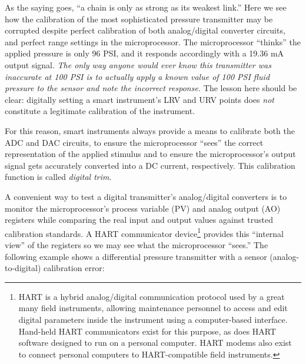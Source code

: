 As the saying goes, ``a chain is only as strong as its weakest link.''  Here we see how the calibration of the most sophisticated pressure transmitter may be corrupted despite perfect calibration of both analog/digital converter circuits, and perfect range settings in the microprocessor.  The microprocessor ``thinks'' the applied pressure is only 96 PSI, and it responds accordingly with a 19.36 mA output signal.  \textit{The only way anyone would ever know this transmitter was inaccurate at 100 PSI is to actually apply a known value of 100 PSI fluid pressure to the sensor and note the incorrect response.}  The lesson here should be clear: digitally setting a smart instrument's LRV and URV points does \textit{not} constitute a legitimate calibration of the instrument.

For this reason, smart instruments always provide a means to calibrate both the ADC and DAC circuits, to ensure the microprocessor ``sees'' the correct representation of the applied stimulus and to ensure the microprocessor's output signal gets accurately converted into a DC current, respectively.  This calibration function is called \textit{digital trim}.

\filbreak

A convenient way to test a digital transmitter's analog/digital converters is to monitor the microprocessor's process variable (PV) and analog output (AO) registers while comparing the real input and output values against trusted calibration standards.  A HART communicator device\footnote{HART is a hybrid analog/digital communication protocol used by a great many field instruments, allowing maintenance personnel to access and edit digital parameters inside the instrument using a computer-based interface.  Hand-held HART communicators exist for this purpose, as does HART software designed to run on a personal computer.  HART modems also exist to connect personal computers to HART-compatible field instruments.} provides this ``internal view'' of the registers so we may see what the microprocessor ``sees.''  The following example shows a differential pressure transmitter with a sensor (analog-to-digital) calibration error:

